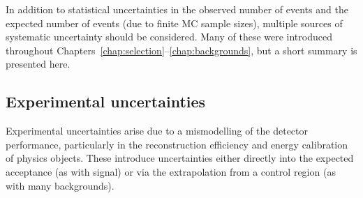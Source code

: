 
In addition to statistical uncertainties in the observed number of events and the expected 
number of events (due to finite MC sample sizes), multiple sources of systematic uncertainty 
should be considered. Many of these were introduced throughout 
Chapters~\ref{chap:selection}--\ref{chap:backgrounds}, but a short summary is presented here.



\subsection{Experimental uncertainties}
\label{sec:syst:exp}

Experimental uncertainties arise due to a mismodelling of the detector performance, 
particularly in the reconstruction efficiency and energy calibration of physics objects. 
These introduce uncertainties either directly into the expected acceptance (as with signal) 
or via the extrapolation from a control region (as with many backgrounds).

